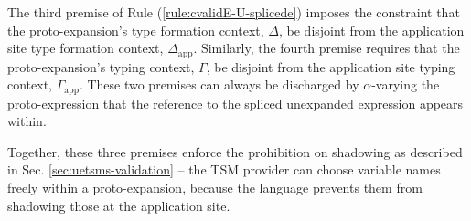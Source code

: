The third premise of Rule (\ref{rule:cvalidE-U-splicede}) imposes the constraint that the proto-expansion's type formation context, $\Delta$, be disjoint from the application site type formation context, $\Delta_\text{app}$. Similarly, the fourth premise requires that the proto-expansion's typing context, $\Gamma$, be disjoint from the application site typing context, $\Gamma_\text{app}$. These two premises can always be discharged by $\alpha$-varying the proto-expression that the reference to the spliced unexpanded expression appears within. 

Together, these three premises enforce the prohibition on shadowing as described in Sec. \ref{sec:uetsms-validation} -- the TSM provider can choose variable names freely within a proto-expansion, because the language prevents them from shadowing those at the application site.
